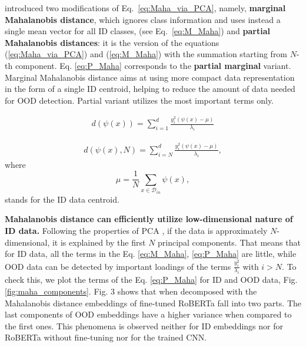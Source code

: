 \documentclass[letterpaper, final]{article} %
\begin{document}
\citet*{Kamoi2020WhyIT} introduced two modifications of Eq.~\ref{eq:Maha_via_PCA}, namely, {\bf marginal Mahalanobis distance}, which  ignores class information and uses instead a single mean vector for all ID classes, (see Eq.~\ref{eq:M_Maha}) and {\bf partial Mahalanobis distances}: it is the version of the equations (\ref{eq:Maha_via_PCA}) and (\ref{eq:M_Maha}) with the summation starting from $N$-th component. Eq. \ref{eq:P_Maha} corresponds to the {\bf partial marginal} variant. Marginal Mahalanobis distance aims at using more compact data representation in the form of a single ID centroid, helping to reduce the amount of data needed for OOD detection. Partial variant utilizes  the most important terms only.

\begin{equation}
\begin{gathered}
        d(\psi(x))=\sum\limits_{i=1}^{d}\frac{y_i^2(\psi(x)-\mu)}{\lambda_i}
\end{gathered}
\label{eq:M_Maha}
\end{equation}

\begin{equation}
\begin{gathered}
        d(\psi(x), N) = \sum\limits_{i=N}^{d} \frac{y_i^2(\psi(x)-\mu)}{\lambda_i}, 
\end{gathered}
\label{eq:P_Maha}
\end{equation}
where
$$
\mu  = \frac{1}{N}\sum\limits_{x\in\mathcal{D}_{in}} \psi(x), 
$$
stands for the ID data centroid.

{\bf Mahalanobis distance can efficiently utilize low-dimensional nature of ID data.} 
 Following the properties of PCA \cite{murphy2012machine}, if the data is approximately $N$-dimensional, it is explained by the first $N$ principal components. That means that for ID data, all the terms in the Eq. \ref{eq:M_Maha}, \ref{eq:P_Maha} are little, while OOD data can be detected by important loadings of the terms $\frac{y_i^2}{\lambda_i}$ with $i>N$.
 To check this, we plot the terms of the Eq. \ref{eq:P_Maha} for ID and OOD data, Fig. \ref{fig:maha_components}. Fig. 3 shows that when decomposed with the Mahalanobis distance embeddings of fine-tuned RoBERTa fall into two parts. The last components of OOD embeddings have a higher variance when compared to the first ones. This phenomena is observed neither for ID embeddings nor for RoBERTa without fine-tuning nor for the trained CNN. 
\end{document}
